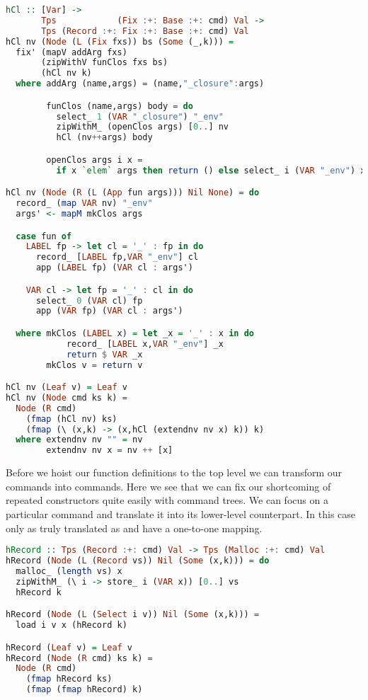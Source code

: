 \begin{lstlisting}[language=Haskell]
hCl :: [Var] ->
       Tps            (Fix :+: Base :+: cmd) Val ->
       Tps (Record :+: Fix :+: Base :+: cmd) Val
hCl nv (Node (L (Fix fxs)) bs (Some (_,k))) =
  fix' (mapV addArg fxs)
       (zipWithV funClos fxs bs)
       (hCl nv k)
  where addArg (name,args) = (name,"_closure":args)

        funClos (name,args) body = do
          select_ 1 (VAR "_closure") "_env"
          zipWithM_ (openClos args) [0..] nv
          hCl (nv++args) body

        openClos args i x =
          if x `elem` args then return () else select_ i (VAR "_env") x

hCl nv (Node (R (L (App fun args))) Nil None) = do
  record_ (map VAR nv) "_env"
  args' <- mapM mkClos args

  case fun of
    LABEL fp -> let cl = '_' : fp in do
      record_ [LABEL fp,VAR "_env"] cl
      app (LABEL fp) (VAR cl : args')

    VAR cl -> let fp = '_' : cl in do
      select_ 0 (VAR cl) fp
      app (VAR fp) (VAR cl : args')

  where mkClos (LABEL x) = let _x = '_' : x in do
            record_ [LABEL x,VAR "_env"] _x
            return $ VAR _x
        mkClos v = return v

hCl nv (Leaf v) = Leaf v
hCl nv (Node cmd ks k) =
  Node (R cmd)
    (fmap (hCl nv) ks)
    (fmap (\ (x,k) -> (x,hCl (extendnv nv x) k)) k)
  where extendnv nv "" = nv
        extendnv nv x = nv ++ [x]
\end{lstlisting}

Before we hoist our function definitions to the top level we can transform our  commands into  commands. Here we see that we can fix our shortcoming of repeated constructors quite easily with command trees. We can focus on a particular command and translate it into its lower-level counterpart. In this case only  as truly translated as  and  have a one-to-one mapping.

\begin{lstlisting}[language=Haskell]
hRecord :: Tps (Record :+: cmd) Val -> Tps (Malloc :+: cmd) Val
hRecord (Node (L (Record vs)) Nil (Some (x,k))) = do
  malloc_ (length vs) x
  zipWithM_ (\ i -> store_ i (VAR x)) [0..] vs
  hRecord k

hRecord (Node (L (Select i v)) Nil (Some (x,k))) =
  load i v x (hRecord k)

hRecord (Leaf v) = Leaf v
hRecord (Node (R cmd) ks k) =
  Node (R cmd)
    (fmap hRecord ks)
    (fmap (fmap hRecord) k)
\end{lstlisting}

